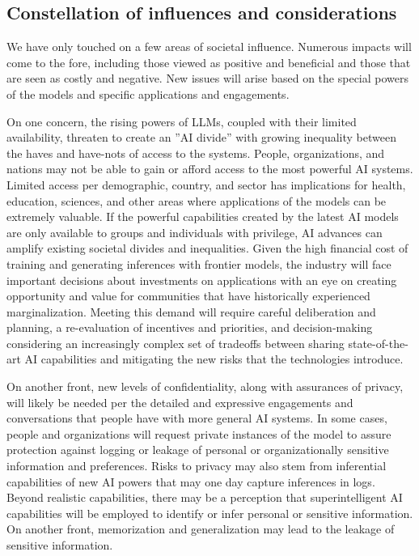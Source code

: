 \subsection{Constellation of influences and considerations} 

We have only touched on a few areas of societal influence. Numerous impacts will come to the fore, including those viewed as positive and beneficial and those that are seen as costly and negative. New issues will arise based on the special powers of the models and specific applications and engagements. 

On one concern, the rising powers of LLMs, coupled with their limited availability, threaten to create an ''AI divide'' with growing inequality between the haves and have-nots of access to the systems. People, organizations, and nations may not be able to gain or afford access to the most powerful AI systems. Limited access per demographic, country, and sector has implications for health, education, sciences, and other areas where applications of the models can be extremely valuable. If the powerful capabilities created by the latest AI models are only available to groups and individuals with privilege, AI advances can amplify existing societal divides and inequalities. Given the high financial cost of training and generating inferences with frontier models, the industry will face important decisions about investments on applications with an eye on creating opportunity and value for communities that have historically experienced marginalization. Meeting this demand will require careful deliberation and planning, a re-evaluation of incentives and priorities, and decision-making considering an increasingly complex set of tradeoffs between sharing state-of-the-art AI capabilities and mitigating the new risks that the technologies introduce.

On another front, new levels of confidentiality, along with assurances of privacy, will likely be needed per the detailed and expressive engagements and conversations that people have with more general AI systems. In some cases, people and organizations will request private instances of the model to assure protection against logging or leakage of personal or organizationally sensitive information and preferences. Risks to privacy may also stem from inferential capabilities of new AI powers that may one day capture inferences in logs. Beyond realistic capabilities, there may be a perception that superintelligent AI capabilities will be employed to identify or infer personal or sensitive information. On another front, memorization and generalization may lead to the leakage of sensitive information. 

